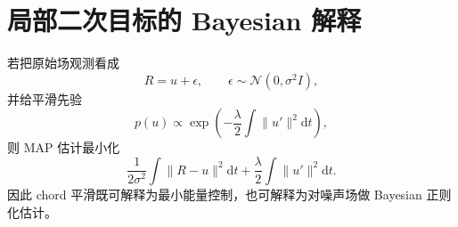 \documentclass[UTF8,12pt,a4paper,fontset=none]{ctexart}
\numberwithin{equation}{section}
\newcommand{\dd}{\mathrm{d}}
\begin{document}
\section{局部二次目标的 Bayesian 解释}
若把原始场观测看成
\begin{equation}
 R=u+\epsilon,
 \qquad \epsilon\sim\mathcal N(0,\sigma^2I),
\end{equation}
并给平滑先验
\begin{equation}
 p(u)\propto
 \exp\left(-\frac\lambda2\int\|u'\|^2\dd t\right),
\end{equation}
则 MAP 估计最小化
\begin{equation}
 \frac1{2\sigma^2}\int\|R-u\|^2\dd t+
 \frac\lambda2\int\|u'\|^2\dd t.
\end{equation}
因此 chord 平滑既可解释为最小能量控制，也可解释为对噪声场做 Bayesian 正则化估计。
\end{document}
